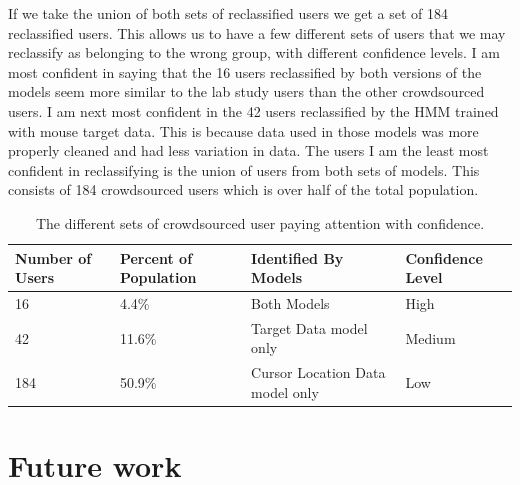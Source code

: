 \documentclass{article}
\begin{document}
If we take the union of both sets of reclassified users we get a set of 184 reclassified users.
This allows us to have a few different sets of users that we may reclassify as belonging to the wrong group, with different confidence levels.
I am most confident in saying that the 16 users reclassified by both versions of the models seem more similar to the lab study users than the other crowdsourced users.
I am next most confident in the 42 users reclassified by the HMM trained with mouse target data.
This is because data used in those models was more properly cleaned and had less variation in data.
The users I am the least most confident in reclassifying is the union of users from both sets of models.
This consists of 184 crowdsourced users which is over half of the total population.

\begin{table}[ht]
    \caption{\label{table:usersattention} The different sets of crowdsourced user paying attention with confidence.}
    \small
    \begin{tabular}{llll}
        \hline
        Number of Users & Percent of Population & Identified By Models             & Confidence Level \\  \hline
        16              & 4.4\%                 & Both Models                      & High  \\
        42              & 11.6\%                & Target Data model only           & Medium  \\  
        184             & 50.9\%                & Cursor Location Data model only  & Low  \\  \hline
    \end{tabular}
\end{table}


\section{Future work}
\end{document}
